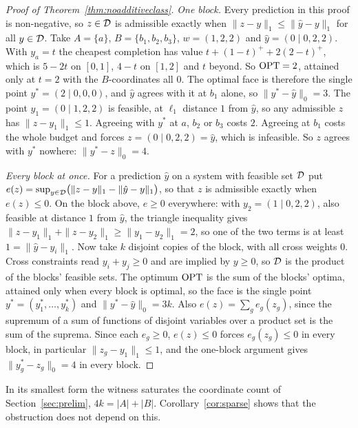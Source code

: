 \begin{proof}[Proof of Theorem~\ref{thm:noadditiveclass}]
\emph{One block.} Every prediction in this proof is non-negative, so $z \in \mathcal{D}$ is admissible exactly when $\|z - y\|_1 \le \|\hat y - y\|_1$ for all $y \in \mathcal{D}$. Take $A = \{a\}$, $B = \{b_1, b_2, b_3\}$, $w = (1, 2, 2)$ and $\hat y = (0 \mid 0, 2, 2)$. With $y_a = t$ the cheapest completion has value
$t + (1-t)^+ + 2(2-t)^+$, which is $5 - 2t$ on $[0,1]$, $4 - t$ on $[1,2]$ and $t$ beyond. So
$\mathrm{OPT} = 2$, attained only at $t = 2$ with the $B$-coordinates all $0$. The optimal face is
therefore the single point $y^* = (2 \mid 0, 0, 0)$, and $\hat y$ agrees with it at $b_1$ alone,
so $\|y^* - \hat y\|_0 = 3$. The point $y_1 = (0 \mid 1, 2, 2)$ is feasible, at $\ell_1$ distance
$1$ from $\hat y$, so any admissible $z$ has $\|z - y_1\|_1 \le 1$. Agreeing with $y^*$ at $a$,
$b_2$ or $b_3$ costs $2$. Agreeing at $b_1$ costs the whole budget and forces
$z = (0 \mid 0, 2, 2) = \hat y$, which is infeasible. So $z$ agrees with $y^*$ nowhere:
$\|y^* - z\|_0 = 4$.

\emph{Every block at once.} For a prediction $\hat y$ on a system with feasible set $\mathcal{D}$ put
$e(z) = \sup_{y \in \mathcal{D}} \bigl(\|z - y\|_1 - \|\hat y - y\|_1\bigr)$, so that $z$ is admissible
exactly when $e(z) \le 0$. On the block above, $e \ge 0$ everywhere: with $y_2 = (1 \mid 0, 2, 2)$,
also feasible at distance $1$ from $\hat y$, the triangle inequality gives
$\|z - y_1\|_1 + \|z - y_2\|_1 \ge \|y_1 - y_2\|_1 = 2$, so one of the two terms is at least
$1 = \|\hat y - y_i\|_1$. Now take $k$ disjoint copies of the block, with all cross weights $0$.
Cross constraints read $y_i + y_j \ge 0$ and are implied by $y \ge 0$, so $\mathcal{D}$ is the product
of the blocks' feasible sets. The optimum $\mathrm{OPT}$ is the sum of the blocks' optima, attained only
when every block is optimal, so the face is the single point $y^* = (y^*_1, \dots, y^*_k)$ and
$\|y^* - \hat y\|_0 = 3k$. Also $e(z) = \sum_g e_g(z_g)$, since the supremum of a sum of functions
of disjoint variables over a product set is the sum of the suprema. Since each $e_g \ge 0$,
$e(z) \le 0$ forces $e_g(z_g) \le 0$ in every block, in particular $\|z_g - y_1\|_1 \le 1$, and the
one-block argument gives $\|y^*_g - z_g\|_0 = 4$ in every block.
\end{proof}

In its smallest form the witness saturates the coordinate count of Section~\ref{sec:prelim},
$4k = |A|+|B|$. Corollary~\ref{cor:sparse} shows that the obstruction does not depend on
this.

